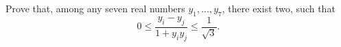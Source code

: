 Prove that, among any seven real numbers $y_1, \ldots, y_7$, there exist two, such that
\[ 0 \leq \frac{y_i - y_j}{1 + y_iy_j} \leq \frac{1}{\sqrt{3}}. \]
